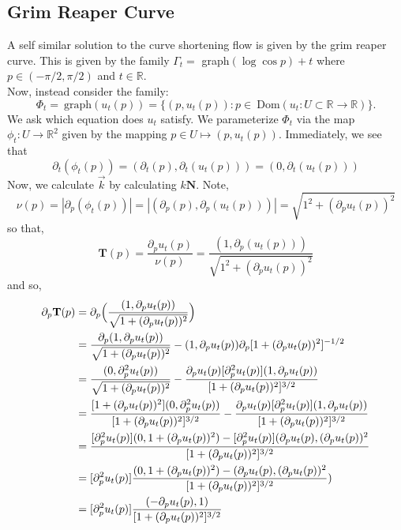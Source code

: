 \documentclass{article}
\begin{document}
\subsection{Grim Reaper Curve}

A self similar solution to the curve shortening flow is given by the grim reaper curve. This is given by the family
$\Gamma_t =$ graph$(\log \cos p)+t$ where $p\in(-\pi/2,\pi/2)$ and $t\in\mathbb{R}$.\\

Now, instead consider the family: 
\[ \Phi_t =\:\text{graph}(u_t(p)) = \{(p,u_t(p)): p\in\:\text{Dom}(u_t:U\subset\mathbb{R}\to\mathbb{R})\}. \]
We ask which equation does $u_t$ satisfy. We parameterize $\Phi_t$ via the map $\phi_t: U\to \mathbb{R}^2$ given by
the mapping $p\in U\mapsto (p,u_t(p))$. Immediately, we see that 
\[ \partial_t(\phi_t(p)) = (\partial_t(p),\partial_t(u_t(p))) = (0,\partial_t(u_t(p))) \]
Now, we calculate $\vec{k}$ by calculating $k\textbf{N}$. Note, 
\[ \nu(p) = |\partial_p(\phi_t(p))| = |(\partial_p(p),\partial_p(u_t(p)))| = \sqrt{1^2 + (\partial_p u_t(p))^2}\]
so that,
\[ \mathbf{T}(p) = \frac{\partial_p u_t(p)}{\nu(p)} = \frac{(1,\partial_p(u_t(p)))}{\sqrt{1^2 + (\partial_p u_t(p))^2}}\]
and so,
\begin{align*}
    \partial_p \mathbf{T}(p) &= \partial_p\Big{(}\frac{(1,\partial_p u_t(p))}{\sqrt{1+(\partial_p u_t(p))^2}}\Big{)} \\
    &= \frac{\partial_p (1,\partial_p u_t(p))}{\sqrt{1+(\partial_p u_t(p))^2}} - (1,\partial_p u_t(p))\partial_p[1+(\partial_p u_t(p))^2]^{-1/2} \\
    &= \frac{(0,\partial_p^2 u_t(p))}{\sqrt{1+(\partial_p u_t(p))^2}} - \frac{\partial_p u_t(p)[\partial_p^2 u_t(p)](1,\partial_p u_t(p))}{[1+(\partial_p u_t(p))^2]^{3/2}} \\
    &= \frac{[1+(\partial_p u_t(p))^2](0,\partial_p^2 u_t(p))}{[1+(\partial_p u_t(p))^2]^{3/2}} - \frac{\partial_p u_t(p)[\partial_p^2 u_t(p)](1,\partial_p u_t(p))}{[1+(\partial_p u_t(p))^2]^{3/2}} \\
    &= \frac{[\partial_p^2 u_t(p)](0,1+(\partial_p u_t(p))^2) - [\partial_p^2 u_t(p)](\partial_p u_t(p),(\partial_p u_t(p))^2}{[1+(\partial_p u_t(p))^2]^{3/2}} \\
    &= [\partial_p^2 u_t(p)]\frac{(0,1+(\partial_p u_t(p))^2) - (\partial_p u_t(p),(\partial_p u_t(p))^2}{[1+(\partial_p u_t(p))^2]^{3/2}}) \\
    &= [\partial_p^2 u_t(p)]\frac{(-\partial_p u_t(p),1)}{[1+(\partial_p u_t(p))^2]^{3/2}}
\end{align*}
\end{document}
